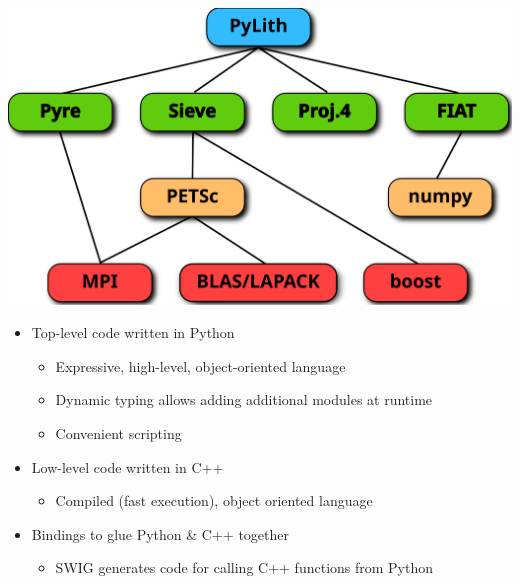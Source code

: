 \documentclass[pdftex,cig,slideColor]{pp4slides}
\begin{document}

  \vfill
  \begin{center}
    \includegraphics[scale=0.9]{figs/packages}
  \end{center}


  \begin{itemize}
  \item Top-level code written in Python
    \begin{itemize}
    \item Expressive, high-level, object-oriented language
    \item Dynamic typing allows adding additional modules at runtime
    \item Convenient scripting
    \end{itemize}
  \item Low-level code written in C++
    \begin{itemize}
    \item Compiled (fast execution), object oriented language
    \end{itemize}
  \item Bindings to glue Python \& C++ together
    \begin{itemize}
    \item SWIG generates code for calling C++ functions from Python
    \end{itemize}
  \end{itemize}
\end{document}
